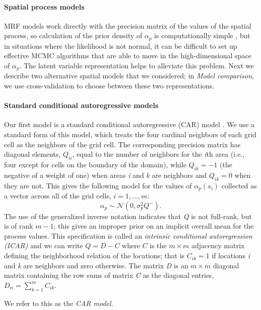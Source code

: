 \documentclass[10pt,letterpaper]{article}
\newcommand{\N}{\mathcal{N}}
\begin{document}
\paragraph*{Spatial process models}

MRF models work directly with the precision matrix of the values of
the spatial process, so calculation of the prior density of $\alpha_{p}$
is computationally simple \cite{Rue:Held:2005}, but in situations
where the likelihood is not normal, it can be difficult to set up
effective MCMC algorithms that are able to move in the high-dimensional
space of $\alpha_{p}$. The latent variable representation helps to alleviate this problem.
Next we describe two alternative spatial models that we considered;
in \emph{Model comparison}, we use cross-validation to
choose between these two representations.


\paragraph{Standard conditional autoregressive models}

Our first model is a standard conditional autoregressive (CAR) model
\cite{Bane:etal:2004}. We use a standard form of this model, which
treats the four cardinal neighbors of each grid cell as the neighbors
of the grid cell. The corresponding precision matrix has diagonal
elements, $Q_{ii}$, equal to the number of neighbors for the \emph{i}th
area (i.e., four except for cells on the boundary of the domain),
while $Q_{ik}=-1$ (the negative of a weight of one) when areas \emph{i}
and \emph{k} are neighbors and $Q_{ik}=0$ when they are not. This gives
the following model for the values of $\alpha_{p}(s_{i})$ collected
as a vector across all of the grid cells, $i=1,\ldots,m$: 
\[
\alpha_{p}\sim\N(0,\sigma_{p}^{2}Q^{-}).
\]
The use of the generalized inverse notation indicates that \emph{Q} is
not full-rank, but is of rank $m-1$; this gives an improper prior
on an implicit overall mean for the process values. This specification
is called an \textit{intrinsic conditional autoregression (ICAR)}
and we can write $Q=D-C$ where $C$ is the $m\times m$ adjacency
matrix defining the neighborhood relation of the locations; that is
$C{}_{ik}=1$ if locations \emph{i} and \emph{k} are neighbors and zero otherwise.
The matrix \emph{D} is an $m\times m$ diagonal matrix containing the
row sums of matrix \emph{C} as the diagonal entries, $D{}_{ii}={\displaystyle \sum_{k=1}^{m}C{}_{ik}}.$

We refer to this as the \emph{CAR model}.
\end{document}

